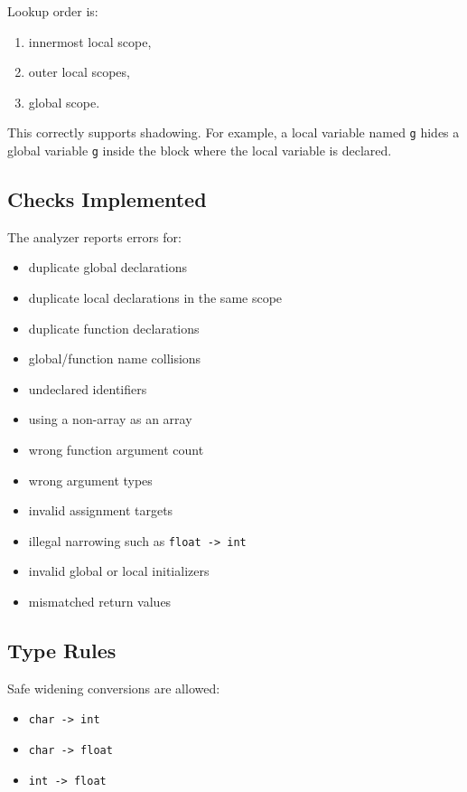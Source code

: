 \documentclass[11pt,a4paper]{article}
\begin{document}
Lookup order is:

\begin{enumerate}[leftmargin=2em]
    \item innermost local scope,
    \item outer local scopes,
    \item global scope.
\end{enumerate}

This correctly supports shadowing. For example, a local variable named
\texttt{g} hides a global variable \texttt{g} inside the block where the local
variable is declared.

\subsection*{Checks Implemented}

The analyzer reports errors for:

\begin{itemize}[leftmargin=2em]
    \item duplicate global declarations
    \item duplicate local declarations in the same scope
    \item duplicate function declarations
    \item global/function name collisions
    \item undeclared identifiers
    \item using a non-array as an array
    \item wrong function argument count
    \item wrong argument types
    \item invalid assignment targets
    \item illegal narrowing such as \texttt{float -> int}
    \item invalid global or local initializers
    \item mismatched return values
\end{itemize}

\subsection*{Type Rules}

Safe widening conversions are allowed:

\begin{itemize}[leftmargin=2em]
    \item \texttt{char -> int}
    \item \texttt{char -> float}
    \item \texttt{int -> float}
\end{itemize}
\end{document}

